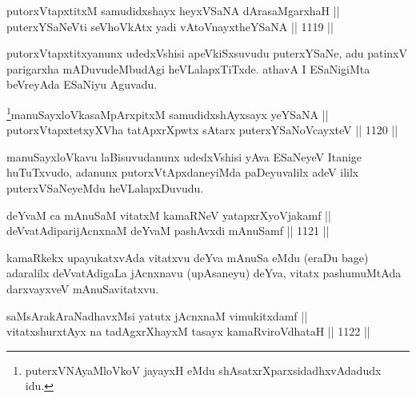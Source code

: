 
\begin{shl}
putorxVtapxtitxM samudidxshayx heyxVSaNA dArasaMgarxhaH || \\
puterxYSaNeVti seVhoVkAtx yadi vA\s toV\s nayxtheYSaNA \hfill || 1119 ||  
\end{shl}

\begin{artha}
putorxVtapxtitxyanunx udedxVshisi apeVkiSxsuvudu puterxYSaNe, adu patinxV parigarxha mADuvudeMbudAgi heVLalapxTiTxde. athavA I ESaNigiMta beVreyAda ESaNiyu Aguvadu.
\end{artha}



\begin{shl}
\footnote{puterxVNAyaMloVkoV jayayxH eMdu shAsatxrXparxsidadhxvAdadudx idu.}manuSayxloVkasaMpArxpitxM samudidxshAyxsayx yeYSaNA || \\
putorxVtapxtetxyXVha tatApxrXpwtx sA\s tarx puterxYSaNoVcayxteV \hfill || 1120 ||  
\end{shl}

\begin{artha}
manuSayxloVkavu laBisuvudanunx udedxVshisi yAva ESaNeyeV Itanige huTuTxvudo, adanunx putorxVtApxdaneyiMda paDeyuvalilx adeV ililx puterxVSaNeyeMdu heVLalapxDuvudu.
\end{artha}


\begin{shl}
deYvaM ca mAnuSaM vitatxM kamaRNeV yatapxrXyoVjakamf ||  \\
deVvatAdiparijAcnxnaM deYvaM pashAvxdi mAnuSamf \hfill || 1121 ||  
\end{shl}

\begin{artha}
kamaRkekx upayukatxvAda vitatxvu deYva mAnuSa eMdu (eraDu bage) adaralilx deVvatAdigaLa jAcnxnavu (upAsaneyu) deYva, vitatx pashumuMtAda darxvayxveV mAnuSavitatxvu.
\end{artha}


\begin{shl}
saMsArakAraNadhavxMsi yatutx jAcnxnaM vimukitxdamf || \\
vitatxshurxtAyx na tadAgxrXhayxM tasayx kamaRviroVdhataH \hfill || 1122 ||  
\end{shl}

